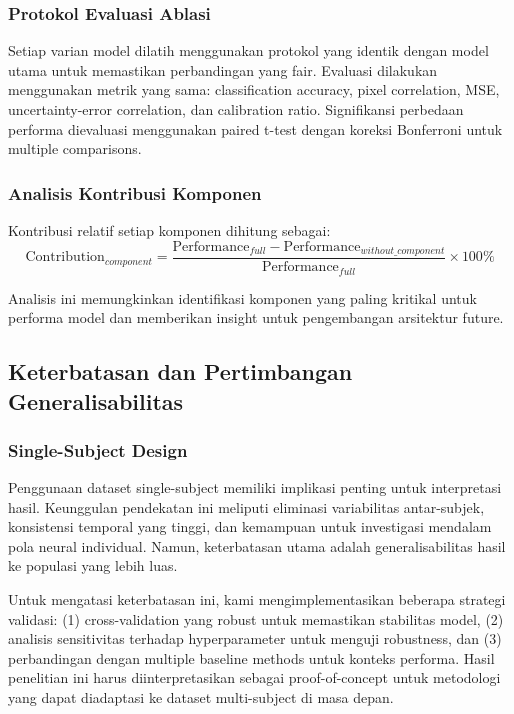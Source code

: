 \subsubsection{Protokol Evaluasi Ablasi}
Setiap varian model dilatih menggunakan protokol yang identik dengan model utama untuk memastikan perbandingan yang fair. Evaluasi dilakukan menggunakan metrik yang sama: classification accuracy, pixel correlation, MSE, uncertainty-error correlation, dan calibration ratio. Signifikansi perbedaan performa dievaluasi menggunakan paired t-test dengan koreksi Bonferroni untuk multiple comparisons.

\subsubsection{Analisis Kontribusi Komponen}
Kontribusi relatif setiap komponen dihitung sebagai:
\begin{equation}
\text{Contribution}_{component} = \frac{\text{Performance}_{full} - \text{Performance}_{without\_component}}{\text{Performance}_{full}} \times 100\%
\label{eq:component_contribution}
\end{equation}

Analisis ini memungkinkan identifikasi komponen yang paling kritikal untuk performa model dan memberikan insight untuk pengembangan arsitektur future.

\subsection{Keterbatasan dan Pertimbangan Generalisabilitas}

\subsubsection{Single-Subject Design}
Penggunaan dataset single-subject memiliki implikasi penting untuk interpretasi hasil. Keunggulan pendekatan ini meliputi eliminasi variabilitas antar-subjek, konsistensi temporal yang tinggi, dan kemampuan untuk investigasi mendalam pola neural individual. Namun, keterbatasan utama adalah generalisabilitas hasil ke populasi yang lebih luas.

Untuk mengatasi keterbatasan ini, kami mengimplementasikan beberapa strategi validasi: (1) cross-validation yang robust untuk memastikan stabilitas model, (2) analisis sensitivitas terhadap hyperparameter untuk menguji robustness, dan (3) perbandingan dengan multiple baseline methods untuk konteks performa. Hasil penelitian ini harus diinterpretasikan sebagai proof-of-concept untuk metodologi yang dapat diadaptasi ke dataset multi-subject di masa depan.

